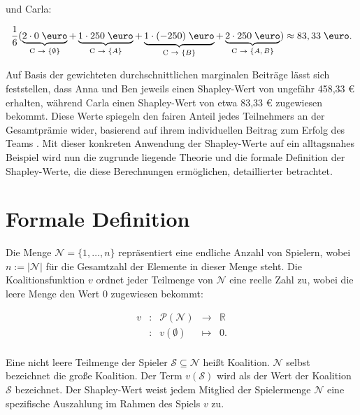 und Carla:

\begin{equation}
  \frac{1}{6} ( \underbrace{2 \cdot 0\;\text{\euro}}_{\text{C $\rightarrow$ $\{\emptyset$\}}} + \underbrace{1 \cdot 250\;\text{\euro}}_{\text{C $\rightarrow$ $\{A$\}}} + \underbrace{1 \cdot (-250)\;\text{\euro}}_{\text{C $\rightarrow$ $\{B$\}}} + \underbrace{2 \cdot 250\;\text{\euro}}_{\text{C $\rightarrow$ $\{A, B$\}}} ) \approx 83,33\;\text{\euro}.  
  \label{eq:marginal_carla}
\end{equation}

Auf Basis der gewichteten durchschnittlichen marginalen Beiträge lässt sich feststellen, 
dass Anna und Ben jeweils einen Shapley-Wert von ungefähr 458,33 \euro{} erhalten, 
während Carla einen Shapley-Wert von etwa 83,33 \euro{} zugewiesen bekommt. 
Diese Werte spiegeln den fairen Anteil jedes Teilnehmers an der Gesamtprämie wider, 
basierend auf ihrem individuellen Beitrag zum Erfolg des Teams \cite[S. 20]{Molnar_2023}. Mit dieser konkreten Anwendung der Shapley-Werte 
auf ein alltagsnahes Beispiel wird nun die zugrunde liegende Theorie und die formale Definition 
der Shapley-Werte, die diese Berechnungen ermöglichen, detaillierter betrachtet.

\section{Formale Definition}

Die Menge $\mathcal{N} = \{1, \ldots, n\}$ repräsentiert eine endliche Anzahl von Spielern, wobei $n := |\mathcal{N}|$ für die Gesamtzahl der 
Elemente in dieser Menge steht. Die Koalitionsfunktion $v$ ordnet jeder Teilmenge von $\mathcal{N}$ eine reelle Zahl zu, 
wobei die leere Menge den Wert $0$ zugewiesen bekommt:

\[
\begin{array}{rcccl}
  v &:  &\mathcal P(\mathcal{N}) &\longrightarrow &\mathbb{R}\\
  &: &v(\emptyset) &\mapsto &0.\\
\end{array}
\]

Eine nicht leere Teilmenge der Spieler $\mathcal{S} \subseteq \mathcal{N}$ heißt Koalition. $\mathcal{N}$ selbst bezeichnet die 
große Koalition.
Der Term $v(\mathcal{S})$ wird als der Wert der Koalition $\mathcal{S}$ bezeichnet. Der Shapley-Wert weist jedem Mitglied der Spielermenge $\mathcal{N}$ eine 
spezifische Auszahlung im Rahmen des Spiels $v$ zu.

